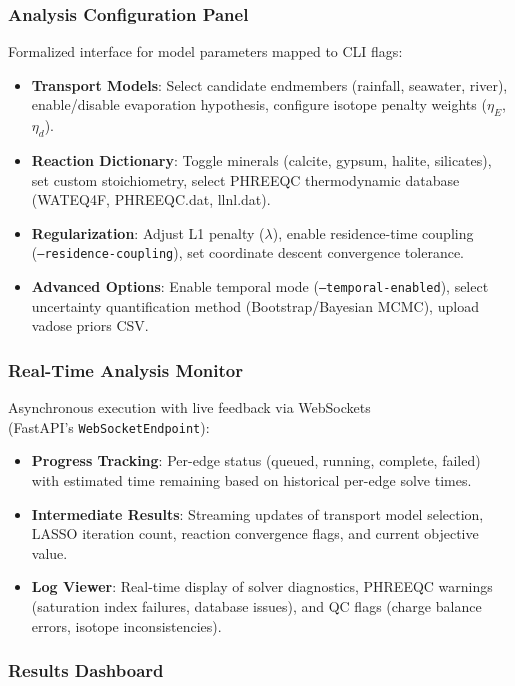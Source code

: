 \subsubsection{Analysis Configuration Panel}

Formalized interface for model parameters mapped to CLI flags:
\begin{itemize}
	\item \textbf{Transport Models}: Select candidate endmembers (rainfall, seawater, river), enable/disable evaporation hypothesis, configure isotope penalty weights ($\eta_E$, $\eta_d$).
	\item \textbf{Reaction Dictionary}: Toggle minerals (calcite, gypsum, halite, silicates), set custom stoichiometry, select PHREEQC thermodynamic database (WATEQ4F, PHREEQC.dat, llnl.dat).
	\item \textbf{Regularization}: Adjust L1 penalty ($\lambda$), enable residence-time coupling\\
	(\texttt{--residence-\allowbreak coupling}), set coordinate descent convergence tolerance.
	\item \textbf{Advanced Options}: Enable temporal mode (\texttt{--temporal-enabled}), select uncertainty quantification method (Bootstrap/Bayesian MCMC), upload vadose priors CSV.
\end{itemize}

\subsubsection{Real-Time Analysis Monitor}

Asynchronous execution with live feedback via WebSockets\\(FastAPI's \texttt{WebSocketEndpoint}):
\begin{itemize}
	\item \textbf{Progress Tracking}: Per-edge status (queued, running, complete, failed) with estimated time remaining based on historical per-edge solve times.
	\item \textbf{Intermediate Results}: Streaming updates of transport model selection, LASSO iteration count, reaction convergence flags, and current objective value.
	\item \textbf{Log Viewer}: Real-time display of solver diagnostics, PHREEQC warnings (saturation index failures, database issues), and QC flags (charge balance errors, isotope inconsistencies).
\end{itemize}

\subsubsection{Results Dashboard}

